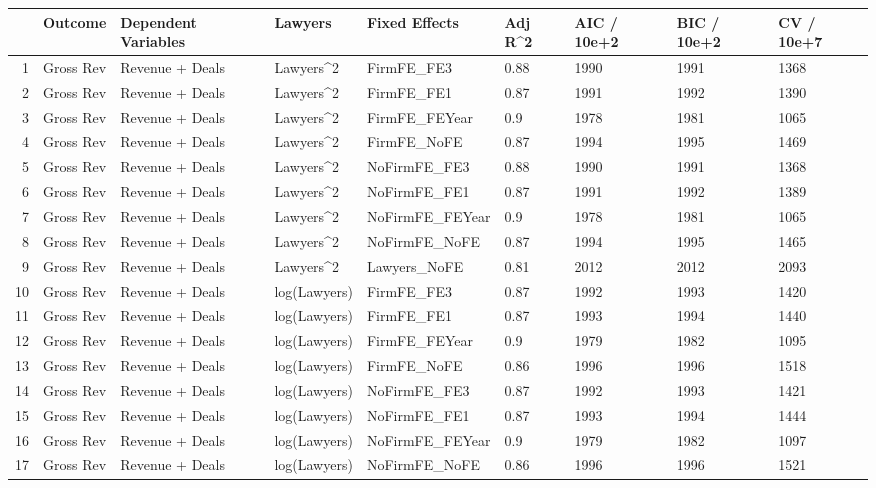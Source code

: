 \documentclass{article}
\begin{document}
\begin{table}[H]
\centering
\begin{tabular}{rllllllll}
  \hline
 & Outcome & Dependent Variables & Lawyers & Fixed Effects & Adj R^2 & AIC / 10e+2 & BIC / 10e+2 & CV / 10e+7 \\ 
  \hline
1 & Gross Rev & Revenue + Deals & Lawyers^2 & FirmFE\_FE3 & 0.88 & 1990 & 1991 & 1368 \\ 
  2 & Gross Rev & Revenue + Deals & Lawyers^2 & FirmFE\_FE1 & 0.87 & 1991 & 1992 & 1390 \\ 
  3 & Gross Rev & Revenue + Deals & Lawyers^2 & FirmFE\_FEYear & 0.9 & 1978 & 1981 & 1065 \\ 
  4 & Gross Rev & Revenue + Deals & Lawyers^2 & FirmFE\_NoFE & 0.87 & 1994 & 1995 & 1469 \\ 
  5 & Gross Rev & Revenue + Deals & Lawyers^2 & NoFirmFE\_FE3 & 0.88 & 1990 & 1991 & 1368 \\ 
  6 & Gross Rev & Revenue + Deals & Lawyers^2 & NoFirmFE\_FE1 & 0.87 & 1991 & 1992 & 1389 \\ 
  7 & Gross Rev & Revenue + Deals & Lawyers^2 & NoFirmFE\_FEYear & 0.9 & 1978 & 1981 & 1065 \\ 
  8 & Gross Rev & Revenue + Deals & Lawyers^2 & NoFirmFE\_NoFE & 0.87 & 1994 & 1995 & 1465 \\ 
  9 & Gross Rev & Revenue + Deals & Lawyers^2 & Lawyers\_NoFE & 0.81 & 2012 & 2012 & 2093 \\ 
  10 & Gross Rev & Revenue + Deals & log(Lawyers) & FirmFE\_FE3 & 0.87 & 1992 & 1993 & 1420 \\ 
  11 & Gross Rev & Revenue + Deals & log(Lawyers) & FirmFE\_FE1 & 0.87 & 1993 & 1994 & 1440 \\ 
  12 & Gross Rev & Revenue + Deals & log(Lawyers) & FirmFE\_FEYear & 0.9 & 1979 & 1982 & 1095 \\ 
  13 & Gross Rev & Revenue + Deals & log(Lawyers) & FirmFE\_NoFE & 0.86 & 1996 & 1996 & 1518 \\ 
  14 & Gross Rev & Revenue + Deals & log(Lawyers) & NoFirmFE\_FE3 & 0.87 & 1992 & 1993 & 1421 \\ 
  15 & Gross Rev & Revenue + Deals & log(Lawyers) & NoFirmFE\_FE1 & 0.87 & 1993 & 1994 & 1444 \\ 
  16 & Gross Rev & Revenue + Deals & log(Lawyers) & NoFirmFE\_FEYear & 0.9 & 1979 & 1982 & 1097 \\ 
  17 & Gross Rev & Revenue + Deals & log(Lawyers) & NoFirmFE\_NoFE & 0.86 & 1996 & 1996 & 1521 \\ 

\end{tabular}
\end{table}
\end{document}
